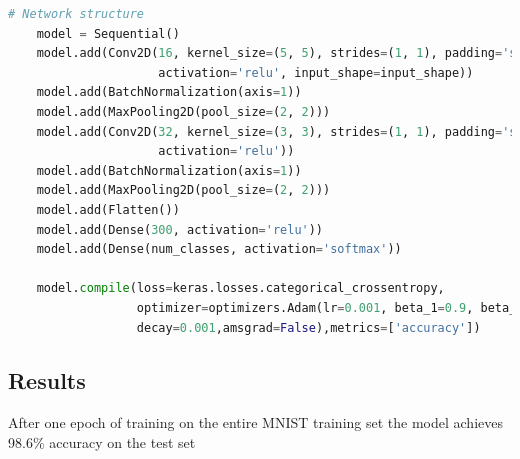 \documentclass[12pt,a4paper]{article}
\theoremstyle{remark}
\begin{document}
\begin{lstlisting}[language=Python, caption={Calculation of moments}]
# Network structure
    model = Sequential()
    model.add(Conv2D(16, kernel_size=(5, 5), strides=(1, 1), padding='same',
                     activation='relu', input_shape=input_shape))
    model.add(BatchNormalization(axis=1))
    model.add(MaxPooling2D(pool_size=(2, 2)))
    model.add(Conv2D(32, kernel_size=(3, 3), strides=(1, 1), padding='same',
                     activation='relu'))
    model.add(BatchNormalization(axis=1))
    model.add(MaxPooling2D(pool_size=(2, 2)))
    model.add(Flatten())
    model.add(Dense(300, activation='relu'))
    model.add(Dense(num_classes, activation='softmax'))

    model.compile(loss=keras.losses.categorical_crossentropy,
                  optimizer=optimizers.Adam(lr=0.001, beta_1=0.9, beta_2=0.999, epsilon=None, 
                  decay=0.001,amsgrad=False),metrics=['accuracy'])

\end{lstlisting}

\subsection{Results} %

After one epoch of training on the entire MNIST training set the model achieves 98.6\% accuracy on the test set
\end{document}
